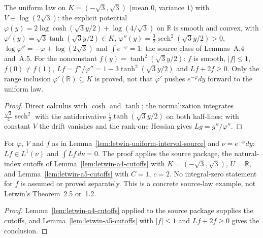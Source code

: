 \begin{lemma}
  \label{lem:letwin-uniform-interval-source}
  \leanok
  The uniform law on $K=(-\sqrt3,\sqrt3)$ (mean $0$, variance $1$) with $V\equiv\log(2\sqrt3)$: the explicit potential
  $\varphi(y)=2\log\cosh(\sqrt3y/2)+\log(4/\sqrt3)$ on $\mathbb R$ is smooth and convex, with
  $\varphi'(y)=\sqrt3\tanh(\sqrt3y/2)\in K$, $\varphi''(y)=\tfrac32\operatorname{sech}^2(\sqrt3y/2)>0$,
  $\log\varphi''=-\varphi+\log(2\sqrt3)$ and $\int e^{-\varphi}=1$: the source class of Lemmas~A.4 and~A.5.  For the
  nonconstant $f(y)=\tanh^2(\sqrt3y/2)$: $f$ is smooth, $|f|\le1$, $f(0)\ne f(1)$, $Lf=f''/\varphi''=1-3\tanh^2(\sqrt3y/2)$
  and $Lf+2f\ge0$.  Only the range inclusion $\varphi'(\mathbb R)\subseteq K$ is proved, not that $\varphi'$ pushes
  $e^{-\varphi}dy$ forward to the uniform law.
\end{lemma}
\begin{proof}
  \leanok
  Direct calculus with $\cosh$ and $\tanh$; the normalization integrates $\tfrac{\sqrt3}{4}\operatorname{sech}^2$ with
  the antiderivative $\tfrac12\tanh(\sqrt3y/2)$ on both half-lines; with constant $V$ the drift vanishes and the rank-one
  Hessian gives $Lg=g''/\varphi''$.
\end{proof}

\begin{lemma}
  \label{lem:letwin-uniform-interval-client}
  \leanok
  For $\varphi$, $V$ and $f$ as in Lemma~\ref{lem:letwin-uniform-interval-source} and $\nu=e^{-\varphi}dy$:
  $Lf\in L^1(\nu)$ and $\int Lf\,d\nu=0$.  The proof applies the source package, the natural-index cutoffs of
  Lemma~\ref{lem:letwin-a4-cutoffs} with $K=(-\sqrt3,\sqrt3)$, $U=\mathbb R$, and Lemma~\ref{lem:letwin-a5-cutoffs} with
  $C=1$, $c=2$.  No integral-zero statement for $f$ is assumed or proved separately.  This is a concrete source-law
  example, not Letwin's Theorem~2.5 or~1.2.
\end{lemma}
\begin{proof}
  \leanok
  Lemma~\ref{lem:letwin-a4-cutoffs} applied to the source package supplies the cutoffs, and
  Lemma~\ref{lem:letwin-a5-cutoffs} with $|f|\le1$ and $Lf+2f\ge0$ gives the conclusion.
\end{proof}

